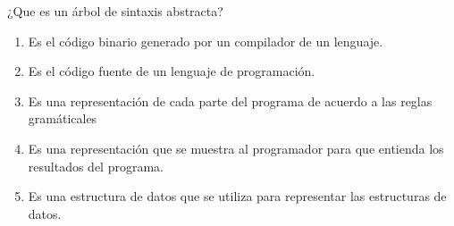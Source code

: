 {
¿Que es un árbol de sintaxis abstracta?

\begin{enumerate}
\item Es el código binario generado por un compilador de un lenguaje.
\item Es el código fuente de un lenguaje de programación.
\item Es una representación de cada parte del programa de acuerdo a las reglas gramáticales %
\item Es una representación que se muestra al programador para que entienda los resultados del programa.
\item Es una estructura de datos que se utiliza para representar las estructuras de datos.
\end{enumerate}

}
